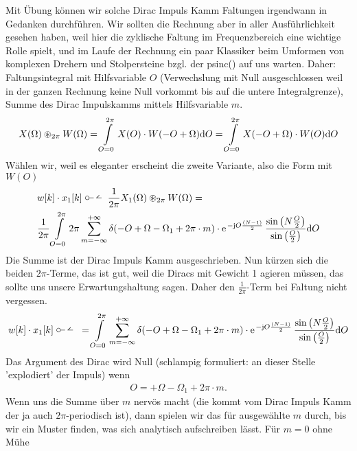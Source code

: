 \begin{ExCalc}
Mit Übung können wir solche Dirac Impuls Kamm Faltungen irgendwann in Gedanken durchführen.
Wir sollten die Rechnung aber in aller Ausführlichkeit gesehen haben, weil hier
die zyklische Faltung im Frequenzbereich eine wichtige Rolle spielt,
und im Laufe der Rechnung ein paar Klassiker beim Umformen von komplexen Drehern
und Stolpersteine bzgl. der psinc() auf uns warten. Daher:
%
Faltungsintegral mit Hilfsvariable $O$ (Verwechslung mit Null ausgeschlossen weil
in der ganzen Rechnung keine Null vorkommt bis auf die untere Integralgrenze),
Summe des Dirac Impulskamms mittels
Hilfsvariable $m$.
\begin{align}
X(\Omega) \circledast_{2\pi} W(\Omega) =
\int\limits_{O=0}^{2\pi} X(O) \cdot W(-O + \Omega) \mathrm{d} O =
\int\limits_{O=0}^{2\pi} X(-O+\Omega) \cdot W(O) \mathrm{d} O
\end{align}
%
Wählen wir, weil es eleganter erscheint die zweite Variante, also die Form mit $W(O)$
\begin{align}
&w[k] \cdot x_1[k]\dtft
\frac{1}{2\pi}
X_1(\Omega) \circledast_{2\pi} W(\Omega)
=\\
&\frac{1}{2\pi}
\int\limits_{O=0}^{2\pi}
2\pi \sum\limits_{m=-\infty}^{+\infty}
\delta(-O+\Omega-\Omega_1 + 2\pi\cdot m)
\cdot
\e^{-\im O \frac{(N-1)}{2}}\,
\frac{\sin\left(N\frac{O}{2}\right)}{\sin\left(\frac{O}{2}\right)}\fsd O
\end{align}
Die Summe ist der Dirac Impuls Kamm ausgeschrieben. Nun kürzen sich die beiden
$2\pi$-Terme, das ist gut, weil die Diracs mit Gewicht 1 agieren müssen, das
sollte uns unsere Erwartungshaltung sagen.
Daher den $\frac{1}{2\pi}$-Term bei Faltung nicht vergessen.
%
\begin{align}
w[k] \cdot x_1[k]\dtft=
\int\limits_{O=0}^{2\pi}
\sum\limits_{m=-\infty}^{+\infty}
\delta(-O+\Omega-\Omega_1 + 2\pi\cdot m)
\cdot
\e^{-\im O \frac{(N-1)}{2}}\,
\frac{\sin\left(N\frac{O}{2}\right)}{\sin\left(\frac{O}{2}\right)}\fsd O
\end{align}
Das Argument des Dirac wird Null (schlampig formuliert:
an dieser Stelle 'explodiert' der Impuls) wenn
\begin{align}
O=+\Omega-\Omega_1 + 2\pi\cdot m.
\end{align}
Wenn uns die Summe über $m$ nervös macht (die kommt vom Dirac Impuls Kamm
der ja auch $2\pi$-periodisch ist), dann spielen wir das für ausgewählte
$m$ durch, bis wir ein Muster finden, was sich analytisch aufschreiben lässt.
%
Für $m=0$ ohne Mühe
\begin{align}

\end{align}
\end{ExCalc}
